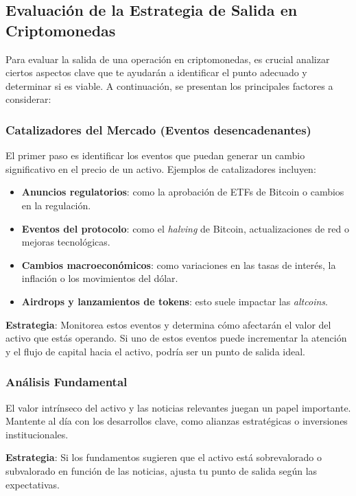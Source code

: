 \documentclass[12pt]{article}
\begin{document}
    \subsection{Evaluación de la Estrategia de Salida en Criptomonedas}

        Para evaluar la salida de una operación en criptomonedas, es crucial analizar ciertos aspectos clave que te ayudarán a identificar el punto adecuado y determinar si es viable. A continuación, se presentan los principales factores a considerar:

        \subsubsection{Catalizadores del Mercado (Eventos desencadenantes)}
            El primer paso es identificar los eventos que puedan generar un cambio significativo en el precio de un activo. Ejemplos de catalizadores incluyen:
            \begin{itemize}
                \item \textbf{Anuncios regulatorios}: como la aprobación de ETFs de Bitcoin o cambios en la regulación.
                \item \textbf{Eventos del protocolo}: como el \textit{halving} de Bitcoin, actualizaciones de red o mejoras tecnológicas.
                \item \textbf{Cambios macroeconómicos}: como variaciones en las tasas de interés, la inflación o los movimientos del dólar.
                \item \textbf{Airdrops y lanzamientos de tokens}: esto suele impactar las \textit{altcoins}.
            \end{itemize}

            \textbf{Estrategia}: Monitorea estos eventos y determina cómo afectarán el valor del activo que estás operando. Si uno de estos eventos puede incrementar la atención y el flujo de capital hacia el activo, podría ser un punto de salida ideal.

        \subsubsection{Análisis Fundamental}
            El valor intrínseco del activo y las noticias relevantes juegan un papel importante. Mantente al día con los desarrollos clave, como alianzas estratégicas o inversiones institucionales.

            \textbf{Estrategia}: Si los fundamentos sugieren que el activo está sobrevalorado o subvalorado en función de las noticias, ajusta tu punto de salida según las expectativas.
\end{document}
